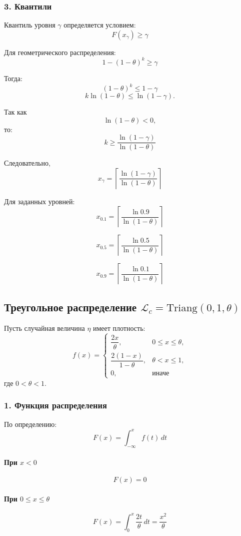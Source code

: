 \documentclass[12pt,a4paper]{article}
\theoremstyle{definition}
\begin{document}
\subsubsection*{3. Квантили}
Квантиль уровня $\gamma$ определяется условием:
\[F(x_\gamma)\ge\gamma\]

Для геометрического распределения:
\[1-(1-\theta)^k\ge\gamma\]

Тогда:
\[(1-\theta)^k\le1-\gamma\]
\[k\ln(1-\theta)\le\ln(1-\gamma).\]

Так как
\[
\ln(1-\theta)<0,
\]
то:
\[k\ge\frac{\ln(1-\gamma)}{\ln(1-\theta)}\]

Следовательно,
\[x_\gamma=\left\lceil\frac{\ln(1-\gamma)}{\ln(1-\theta)}\right\rceil\]

Для заданных уровней:
\[x_{0.1}=\left\lceil\frac{\ln 0.9}{\ln(1-\theta)}\right\rceil\]

\[x_{0.5}=\left\lceil\frac{\ln 0.5}{\ln(1-\theta)}\right\rceil\]

\[x_{0.9}=\left\lceil\frac{\ln 0.1}{\ln(1-\theta)}\right\rceil\]

\subsection{\texorpdfstring
{Треугольное распределение $\mathscr{L}_c=\mathrm{Triang}(0,1,\theta)$}
{Треугольное распределение Lc = Triang(0,1,theta)}}

Пусть случайная величина $\eta$ имеет плотность:
\[
f(x)=
\begin{cases}
\dfrac{2x}{\theta}, & 0\le x\le\theta,\\[1ex]
\dfrac{2(1-x)}{1-\theta}, & \theta<x\le1,\\[1ex]
0, & \text{иначе}
\end{cases}
\]
где $0<\theta<1$.

\subsubsection*{1. Функция распределения}

По определению:
\[F(x)=\int_{-\infty}^{x}f(t)\,dt\]

\paragraph{При $x<0$}
\[F(x)=0\]

\paragraph{При $0\le x\le\theta$}
\[F(x)=\int_0^x \frac{2t}{\theta}\,dt=\frac{x^2}{\theta}\]
\end{document}
